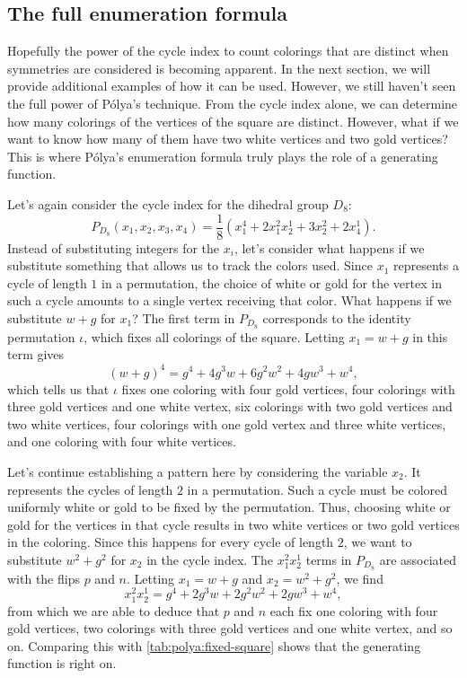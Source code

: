 \subsection{The full enumeration formula}\label{ss:polya:polya:full}

Hopefully the power of the cycle index to count colorings that are
distinct when symmetries are considered is becoming apparent. In the
next section, we will provide additional examples of how it can be
used. However, we still haven't seen the full power of P\'olya's
technique. From the cycle index alone, we can determine how many
colorings of the vertices of the square are distinct. However, what if
we want to know how many of them have two white vertices and two gold
vertices? This is where P\'olya's enumeration formula truly plays the
role of a generating function.

Let's again consider the cycle index for the dihedral group $D_8$:
\[P_{D_8}(x_1,x_2,x_3,x_4) = \frac{1}{8}\left(x_1^4 + 2x_1^2x_2^1 +
  3x_2^2 + 2x_4^1\right).\]
Instead of substituting integers for the $x_i$, let's consider what
happens if we substitute something that allows us to track the colors
used. Since $x_1$ represents a cycle of length $1$ in a permutation,
the choice of white or gold for the vertex in such a cycle amounts to
a single vertex receiving that color. What happens if we substitute
$w+g$ for $x_1$? The first term in $P_{D_8}$ corresponds to the
identity permutation $\iota$, which fixes all colorings of the
square. Letting $x_1=w+g$ in this term gives
\[(w+g)^4 = g^4+4 g^3 w+6 g^2 w^2+4 g w^3+w^4,\]
which tells us that $\iota$ fixes one coloring with four gold
vertices, four colorings with three gold vertices and one white
vertex, six colorings with two gold vertices and two white vertices,
four colorings with one gold vertex and three white vertices, and one
coloring with four white vertices.

Let's continue establishing a pattern here by considering the variable
$x_2$. It represents the cycles of length $2$ in a permutation. Such a
cycle must be colored uniformly white or gold to be fixed by the
permutation. Thus, choosing white or gold for the vertices in that
cycle results in two white vertices or two gold vertices in the
coloring. Since this happens for every cycle of length $2$, we want to
substitute $w^2+g^2$ for $x_2$ in the cycle index. The $x_1^2x_2^1$
terms in $P_{D_8}$ are associated with the flips $p$ and $n$. Letting
$x_1=w+g$ and $x_2 = w^2+g^2$, we find
\[x_1^2x_2^1 = g^4+2 g^3 w+2 g^2 w^2+2 g w^3+w^4,\]
from which we are able to deduce that $p$ and $n$ each fix one
coloring with four gold vertices, two colorings with three gold
vertices and one white vertex, and so on. Comparing this with
\autoref{tab:polya:fixed-square} shows that the generating function is
right on.

